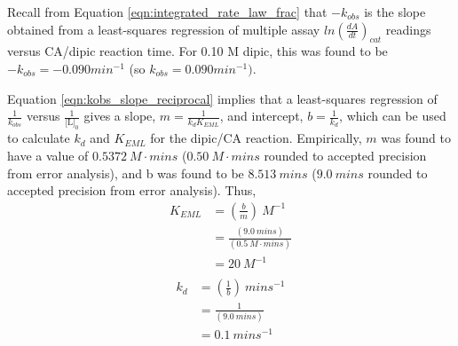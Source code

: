 Recall from Equation \eqref{eqn:integrated_rate_law_frac} that $-k_{obs}$ is the slope obtained from a least-squares regression of multiple assay $ln \left(\frac{dA}{dt}\right)_{cat}$ readings versus CA/dipic reaction time. For 0.10 M dipic, this was found to be $-k_{obs}=-0.090 min^{-1}$ (so $k_{obs}=0.090 min^{-1})$.

Equation \eqref{eqn:kobs_slope_reciprocal} implies that a least-squares regression of $\frac{1}{k_{obs}}$ versus $\frac{1}{\text{[L]}_0}$ gives a slope, $m=\frac{1}{k_{d}K_{EML}}$, and intercept, $b=\frac{1}{k_{d}}$, which can be used to calculate $k_d$ and $K_{EML}$ for the dipic/CA reaction. Empirically, $m$ was found to have a value of $0.5372\ M\cdot{mins}$ ($0.50\ M\cdot{mins}$ rounded to accepted precision from error analysis), and b was found to be $8.513\ mins$ ($9.0\ mins$ rounded to accepted precision from error analysis). Thus,
\begin{equation}\label{eqn:samp_calc_keml}
\begin{split}
K_{EML}&=\left(\frac{b}{m}\right){\ }M^{-1}\\
&=\frac{\left (9.0{\ }mins\right )}{\left (0.5{\ }M\cdot{mins}\right )}\\
&=20\ M^{-1}\\
\end{split}
\end{equation}
\begin{equation}\label{eqn:samp_calc_kd}
\begin{split}
k_{d}&=\left(\frac{1}{b}\right){\ }mins^{-1}\\
&=\frac{1}{\left (9.0{\ }mins\right )}\\
&=0.1\ mins^{-1}\\
\end{split}
\end{equation}